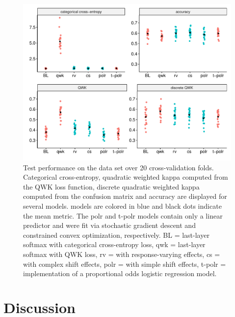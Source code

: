 \documentclass[article,nojss,shortnames]{jss}\usepackage[]{graphicx}\usepackage[]{color}
\begin{document}
\begin{figure}
\centering
\includegraphics[width=1\textwidth]{figures/wine_test_metric}
\caption{Test performance on the  data set over 20 cross-validation
folds. Categorical cross-entropy, quadratic weighted kappa computed from the
QWK loss function, discrete quadratic weighted kappa computed from the confusion
matrix and accuracy are displayed for several models.  models are
colored in blue and black dots indicate the mean metric.
The polr and t-polr models contain only a linear predictor and were fit via
stochastic gradient descent and constrained convex optimization, respectively.
\textsf{BL} = last-layer softmax with categorical cross-entropy loss,
\textsf{qwk} = last-layer softmax with QWK loss, \textsf{rv} = 
with response-varying effects, \textsf{cs} =  with complex shift effects,
\textsf{polr} =  with simple shift effects, \textsf{t-polr} = 
implementation of a proportional odds logistic regression model.} \label{fig:res:wine}
\end{figure}


\section{Discussion} \label{sec:discussion}

\clearpage
\end{document}
